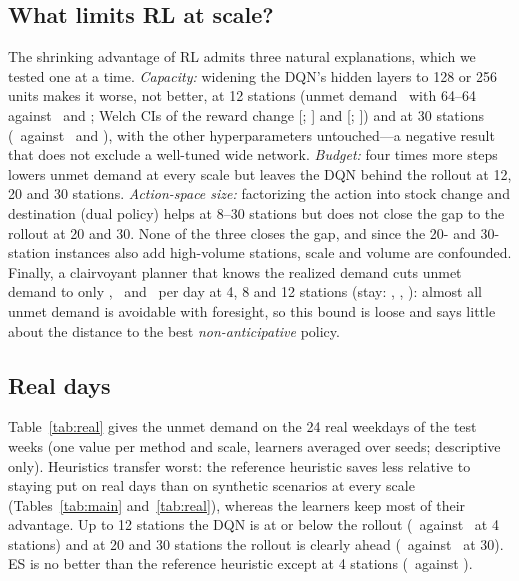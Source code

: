 \documentclass[conference,a4paper]{IEEEtran}
\begin{document}
\subsection{What limits RL at scale?}
The shrinking advantage of RL admits three natural explanations, which we tested one at a time. \emph{Capacity:} widening the DQN's hidden layers to 128 or 256 units
makes it worse, not better, at 12 stations (unmet demand \archBaseC\ with 64--64 against \archWideC\ and \archWiderC; Welch CIs of the reward change
[\archWideDeltaLoC; \archWideDeltaHiC] and [\archWiderDeltaLoC; \archWiderDeltaHiC]) and at 30 stations (\archBaseE\ against \archWideE\ and \archWiderE), with the other
hyperparameters untouched---a negative result that does not exclude a well-tuned wide network. \emph{Budget:} four times more steps lowers unmet demand at every scale
but leaves the DQN behind the rollout at 12, 20 and 30 stations. \emph{Action-space size:} factorizing the action into stock change and destination (dual policy) helps
at 8--30 stations but does not close the gap to the rollout at 20 and 30. None of the three closes the gap, and since the 20- and 30-station instances also add high-volume stations, scale and volume are
confounded. Finally, a clairvoyant planner that knows the realized demand cuts unmet demand to only \clvA, \clvB\ and \clvC\ per day at 4, 8 and 12 stations (stay:
\clvStayA, \clvStayB, \clvStayC): almost all unmet demand is avoidable with foresight, so this bound is loose and says little about the distance to the best
\emph{non-anticipative} policy.

\subsection{Real days}
Table~\ref{tab:real} gives the unmet demand on the 24 real weekdays of the test weeks (one value per method and scale, learners averaged over seeds; descriptive only).
Heuristics transfer worst: the reference heuristic saves less relative to staying put on real days than on synthetic scenarios at every scale (Tables~\ref{tab:main}
and~\ref{tab:real}), whereas the learners keep most of their advantage. Up to 12 stations the DQN is at or below the rollout (\cecRealDqnA\ against \cecRealRollA\ at 4
stations) and at 20 and 30 stations the rollout is clearly ahead (\cecRealRollE\ against \cecRealDqnE\ at 30). ES is no better than the reference heuristic except at 4
stations (\cecRealEsA\ against \cecRealRefA).

\begin{table}[t]
\centering\scriptsize\setlength{\tabcolsep}{4pt}
\caption{Unmet demand per day on the 24 real test weekdays (initial occupancy unknown, set to $50\%\pm2$); no confidence intervals (24 days; planners are single runs).}
\label{tab:real}

\end{table}
\end{document}
